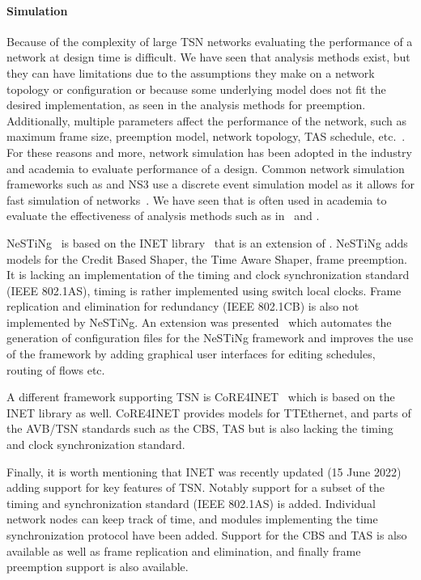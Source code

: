 \paragraph{Simulation} Because of the complexity of large TSN networks evaluating the performance of a network at design time is difficult. We have seen that analysis methods exist, but they can have limitations due to the assumptions they make on a network topology or configuration or because some underlying model does not fit the desired implementation, as seen in the analysis methods for preemption. Additionally, multiple parameters affect the performance of the network, such as maximum frame size, preemption model, network topology, TAS schedule, etc.~\cite{ashjaei2021time}. For these reasons and more, network simulation has been adopted in the industry and academia to evaluate performance of a design. Common network simulation frameworks such as \omnet and NS3 use a discrete event simulation model as it allows for fast simulation of networks~\cite{ashjaei2021time}. We have seen that \omnet is often used in academia to evaluate the effectiveness of analysis methods such as in~\cite{bello2020schedulability} and \cite{ashjaei2021novel}.

NeSTiNg~\cite{falk2019nesting} is based on the INET library~\cite{meszaros2019inet} that is an extension of \omnet. NeSTiNg adds models for the Credit Based Shaper, the Time Aware Shaper, frame preemption. It is lacking an implementation of the timing and clock synchronization standard (IEEE 802.1AS), timing is rather implemented using switch local clocks. Frame replication and elimination for redundancy (IEEE 802.1CB) is also not implemented by NeSTiNg. An extension was presented~\cite{houtan2021automated} which automates the generation of configuration files for the NeSTiNg framework and improves the use of the framework by adding graphical user interfaces for editing schedules, routing of flows etc.

A different \omnet framework supporting TSN is CoRE4INET~\cite{steinbach2011extension} which is based on the INET library as well. CoRE4INET provides models for TTEthernet, and parts of the AVB/TSN standards such as the CBS, TAS but is also lacking the timing and clock synchronization standard.

Finally, it is worth mentioning that INET was recently updated (15 June 2022) adding support for key features of TSN. Notably support for a subset of the timing and synchronization standard (IEEE 802.1AS) is added. Individual network nodes can keep track of time, and modules implementing the time synchronization protocol have been added. Support for the CBS and TAS is also available as well as frame replication and elimination, and finally frame preemption support is also available.